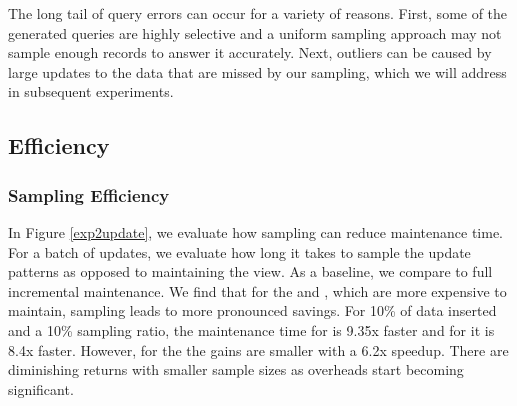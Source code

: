 The long tail of query errors can occur for a variety of reasons.
First, some of the generated queries are highly selective and a uniform sampling approach may not sample enough records to answer it accurately.
Next, outliers can be caused by large updates to the data that are missed by our sampling, which we will address in subsequent experiments.

\subsection{Efficiency}

\subsubsection{Sampling Efficiency}
In Figure \ref{exp2update}, we evaluate how sampling can reduce maintenance time.
For a batch of updates, we evaluate how long it takes to sample the update patterns as opposed to maintaining the view.
As a baseline, we compare to full incremental maintenance.
We find that for the \aggview and \fjview, which are more expensive to maintain, sampling leads to more pronounced savings. 
For 10\% of data inserted and a 10\% sampling ratio, the maintenance time for \fjview  is 9.35x faster and for \aggview it is 8.4x faster.
However, for the \spview the gains are smaller with a 6.2x speedup.
There are diminishing returns with smaller sample sizes as overheads start becoming significant. 

